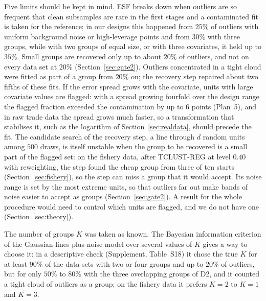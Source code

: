 Five limits should be kept in mind. ESF breaks down when outliers are so frequent that clean
subsamples are rare in the first stages and a contaminated fit is taken for the reference; in
our designs this happened from $25\%$ of outliers with uniform background noise or
high-leverage points and from $30\%$ with three groups, while with two groups of equal size,
or with three covariates, it held up to $35\%$. Small groups are recovered only up to about
$20\%$ of outliers, and not on every data set at $20\%$ (Section~\ref{sec:gate2}). Outliers concentrated in a tight cloud
were fitted as part of a group from $20\%$ on; the recovery step repaired about two fifths of
these fits. If the error spread grows with the covariate, units with large covariate values
are flagged: with a spread growing fourfold over the design range the flagged fraction
exceeded the contamination by up to $6$ points (Plan~5), and in raw trade data the spread
grows much faster, so a transformation that stabilises it, such as the logarithm of
Section~\ref{sec:realdata}, should precede the fit. The candidate search of the recovery step, a line through $d$ random units among $500$
draws, is itself unstable when the group to be recovered is a small part of the flagged set:
on the fishery data, after TCLUST-REG at level $0.40$ with reweighting, the step found the
cheap group from three of ten starts (Section~\ref{sec:fishery}), so the step can miss a
group that it would accept. Its noise range is set by the most extreme units, so that
outliers far out make bands of noise easier to accept as groups (Section~\ref{sec:gate2}).
A result for the whole procedure would need to control which units are flagged, and we do
not have one (Section~\ref{sec:theory}).

The number of groups $K$ was taken as known. The Bayesian information criterion of the
Gaussian-lines-plus-noise model over several values of $K$ gives a way to choose it: in a
descriptive check (Supplement, Table~S18) it chose the true $K$ for at least $90\%$ of the
data sets with two or four groups and up to $20\%$ of outliers, but for only $50\%$ to $80\%$
with the three overlapping groups of D2, and it counted a tight cloud of outliers as a group;
on the fishery data it prefers $K=2$ to $K=1$ and $K=3$.

